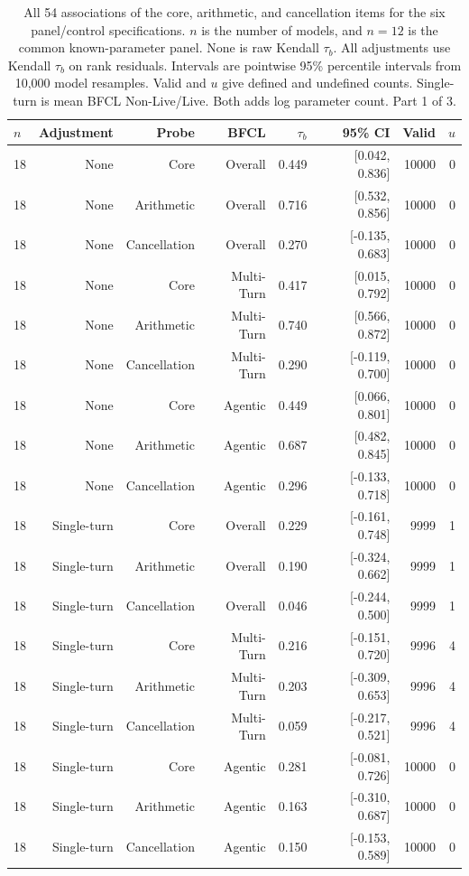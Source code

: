 \begin{table}[t]
\centering
\footnotesize
\setlength{\tabcolsep}{3pt}
\begin{tabular}{lrrrrrrr}
\toprule
$n$ & Adjustment & Probe & BFCL & $\tau_b$ & 95\% CI & Valid & $u$ \\
\midrule
18 & None & Core & Overall & 0.449 & [0.042, 0.836] & 10000 & 0 \\
18 & None & Arithmetic & Overall & 0.716 & [0.532, 0.856] & 10000 & 0 \\
18 & None & Cancellation & Overall & 0.270 & [-0.135, 0.683] & 10000 & 0 \\
18 & None & Core & Multi-Turn & 0.417 & [0.015, 0.792] & 10000 & 0 \\
18 & None & Arithmetic & Multi-Turn & 0.740 & [0.566, 0.872] & 10000 & 0 \\
18 & None & Cancellation & Multi-Turn & 0.290 & [-0.119, 0.700] & 10000 & 0 \\
18 & None & Core & Agentic & 0.449 & [0.066, 0.801] & 10000 & 0 \\
18 & None & Arithmetic & Agentic & 0.687 & [0.482, 0.845] & 10000 & 0 \\
18 & None & Cancellation & Agentic & 0.296 & [-0.133, 0.718] & 10000 & 0 \\
18 & Single-turn & Core & Overall & 0.229 & [-0.161, 0.748] & 9999 & 1 \\
18 & Single-turn & Arithmetic & Overall & 0.190 & [-0.324, 0.662] & 9999 & 1 \\
18 & Single-turn & Cancellation & Overall & 0.046 & [-0.244, 0.500] & 9999 & 1 \\
18 & Single-turn & Core & Multi-Turn & 0.216 & [-0.151, 0.720] & 9996 & 4 \\
18 & Single-turn & Arithmetic & Multi-Turn & 0.203 & [-0.309, 0.653] & 9996 & 4 \\
18 & Single-turn & Cancellation & Multi-Turn & 0.059 & [-0.217, 0.521] & 9996 & 4 \\
18 & Single-turn & Core & Agentic & 0.281 & [-0.081, 0.726] & 10000 & 0 \\
18 & Single-turn & Arithmetic & Agentic & 0.163 & [-0.310, 0.687] & 10000 & 0 \\
18 & Single-turn & Cancellation & Agentic & 0.150 & [-0.153, 0.589] & 10000 & 0 \\
\bottomrule
\end{tabular}
\caption{All 54 associations of the core, arithmetic, and cancellation items for the six panel/control specifications. $n$ is the number of models, and $n=12$ is the common known-parameter panel. None is raw Kendall $\tau_b$. All adjustments use Kendall $\tau_b$ on rank residuals. Intervals are pointwise 95\% percentile intervals from 10,000 model resamples. Valid and $u$ give defined and undefined counts. Single-turn is mean BFCL Non-Live/Live. Both adds log parameter count. Part 1 of 3.}
\label{tab:full-controls}
\end{table}
